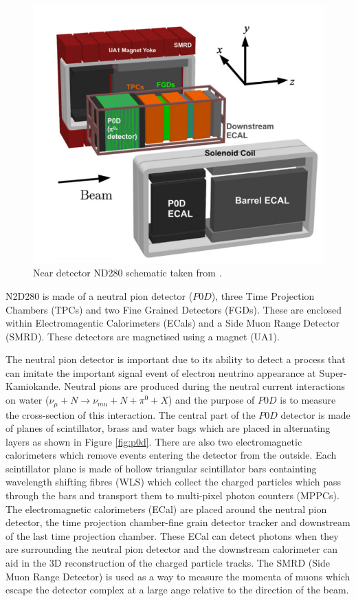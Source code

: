 \begin{figure}
    \includegraphics[width=\textwidth]{Figures/nd280_complex.png}
    \caption{Near detector ND280 schematic taken from \cite{t2kcollaborationT2KExperiment2011}.}
\label{fig:ND280_schematic}
\end{figure}

N2D280 is made of a neutral pion detector ($P0D$), three Time Projection Chambers (TPCs) and two Fine Grained Detectors (FGDs). These are enclosed within Electromagentic Calorimeters (ECals) and a Side Muon Range Detector (SMRD). These detectors are magnetised using a magnet (UA1). 

The neutral pion detector is important due to its ability to detect a process that can imitate the important signal event of electron neutrino appearance at Super-Kamiokande. Neutral pions are produced during the neutral current interactions on water ($\nu_{\mu} + N \rightarrow \nu_{mu} + N +\pi^{0} + X$) and the purpose of $P0D$ is to measure the cross-section of this interaction. The central part of the $P0D$ detector is made of planes of scintillator, brass and water bags which are placed in alternating layers as shown in Figure \ref{fig:p0d}. There are also two electromagnetic calorimeters which remove events entering the detector from the outside.  Each scintillator plane is made of hollow triangular scintillator bars containting wavelength shifting fibres (WLS) which collect the charged particles which pass through the bars and transport them to multi-pixel photon counters (MPPCs). The electromagnetic calorimeters (ECal) are placed around the neutral pion detector, the time projection chamber-fine grain detector tracker and downstream of the last time projection chamber. These ECal can detect photons when they are surrounding the neutral pion detector and the downstream calorimeter can aid in the 3D reconstruction of the charged particle tracks. The SMRD (Side Muon Range Detector) is used as a way to measure the momenta of muons which escape the detector complex at a large ange relative to the direction of the beam.

